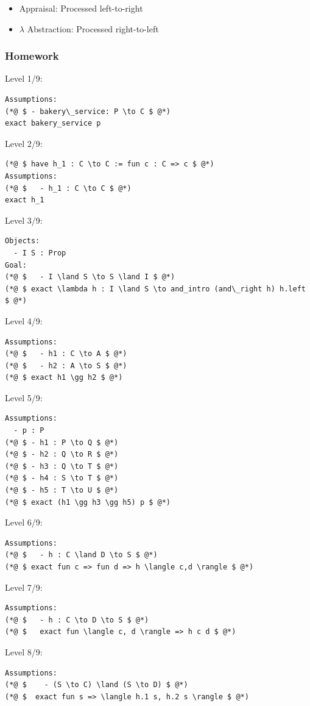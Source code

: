 \documentclass{article}
\theoremstyle{theorem}
\theoremstyle{definition}
\theoremstyle{remark}
\begin{document}
\begin{itemize}
  \item Appraisal: Processed left-to-right
  \item $\lambda$ Abstraction: Processed right-to-left
\end{itemize}

\subsubsection*{Homework}

Level 1/9:
\begin{lstlisting}
Assumptions:
(*@ $ - bakery\_service: P \to C $ @*)
exact bakery_service p
\end{lstlisting}

Level 2/9:
\begin{lstlisting}
(*@ $ have h_1 : C \to C := fun c : C => c $ @*)
Assumptions:
(*@ $   - h_1 : C \to C $ @*)
exact h_1
\end{lstlisting}

Level 3/9:
\begin{lstlisting}
Objects:
  - I S : Prop
Goal:
(*@ $   - I \land S \to S \land I $ @*)
(*@ $ exact \lambda h : I \land S \to and_intro (and\_right h) h.left $ @*)
\end{lstlisting}

Level 4/9:
\begin{lstlisting}
Assumptions:
(*@ $   - h1 : C \to A $ @*)
(*@ $   - h2 : A \to S $ @*)
(*@ $ exact h1 \gg h2 $ @*)
\end{lstlisting}

Level 5/9:
\begin{lstlisting}
Assumptions:
  - p : P
(*@ $ - h1 : P \to Q $ @*)
(*@ $ - h2 : Q \to R $ @*)
(*@ $ - h3 : Q \to T $ @*)
(*@ $ - h4 : S \to T $ @*)
(*@ $ - h5 : T \to U $ @*)
(*@ $ exact (h1 \gg h3 \gg h5) p $ @*)
\end{lstlisting}

Level 6/9:
\begin{lstlisting}
Assumptions:
(*@ $   - h : C \land D \to S $ @*)
(*@ $ exact fun c => fun d => h \langle c,d \rangle $ @*)
\end{lstlisting}

Level 7/9:
\begin{lstlisting}
Assumptions:
(*@ $   - h : C \to D \to S $ @*)
(*@ $   exact fun \langle c, d \rangle => h c d $ @*)
\end{lstlisting}

Level 8/9:
\begin{lstlisting}
Assumptions:
(*@ $    - (S \to C) \land (S \to D) $ @*)
(*@ $  exact fun s => \langle h.1 s, h.2 s \rangle $ @*)
\end{lstlisting}
\end{document}

